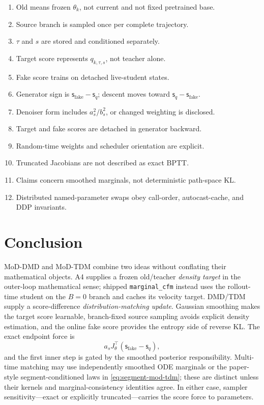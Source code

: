 \documentclass[11pt,a4paper]{article}
\newcommand{\fake}{\mathrm{fake}}
\newcommand{\score}{\mathsf{s}}
\theoremstyle{plain}
\theoremstyle{definition}
\begin{document}
\begin{tcolorbox}[colback=green!5,colframe=green!50!black,title=Minimum mathematically faithful MoD implementation]
\begin{enumerate}[leftmargin=1.5em]
\item[$\checkmark$] Old means frozen $\theta_k$, not current and not fixed pretrained base.
\item[$\checkmark$] Source branch is sampled once per complete trajectory.
\item[$\checkmark$] $\tau$ and $s$ are stored and conditioned separately.
\item[$\checkmark$] Target score represents $q_{k,\tau,s}$, not teacher alone.
\item[$\checkmark$] Fake score trains on detached live-student states.
\item[$\checkmark$] Generator sign is $\score_{\fake}-\score_q$; descent moves toward
      $\score_q-\score_{\fake}$.
\item[$\checkmark$] Denoiser form includes $a_s^2/b_s^2$, or changed weighting is disclosed.
\item[$\checkmark$] Target and fake scores are detached in generator backward.
\item[$\checkmark$] Random-time weights and scheduler orientation are explicit.
\item[$\checkmark$] Truncated Jacobians are not described as exact BPTT.
\item[$\checkmark$] Claims concern smoothed marginals, not deterministic path-space KL.
\item[$\checkmark$] Distributed named-parameter swaps obey call-order, autocast-cache, and DDP
      invariants.
\end{enumerate}
\end{tcolorbox}

\section{Conclusion}

MoD-DMD and MoD-TDM combine two ideas without conflating their mathematical objects.  A4 supplies
a frozen old/teacher \emph{density target} in the outer-loop mathematical sense; shipped
\texttt{marginal\_cfm} instead uses the rollout-time student on the $B=0$ branch and caches its
velocity target.  DMD/TDM supply a score-difference
\emph{distribution-matching update}.  Gaussian smoothing makes the target score learnable,
branch-fixed source sampling avoids explicit density estimation, and the online fake score
provides the entropy side of reverse KL.  The exact endpoint force is
\[
a_sJ_\theta^\top(\score_{\fake}-\score_q),
\]
and the first inner step is gated by the smoothed posterior responsibility.  Multi-time matching
may use independently smoothed ODE marginals or the paper-style segment-conditioned laws in
\eqref{eq:segment-mod-tdm}; these are distinct unless their kernels and marginal-consistency
identities agree.  In either case, sampler sensitivity---exact or explicitly truncated---carries
the score force to parameters.
\end{document}
